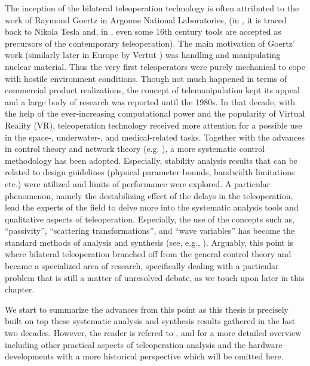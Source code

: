 The inception of the bilateral teleoperation technology is often attributed to the work 
of Raymond Goertz in Argonne National Laboratories, \cite{goertz} (in \cite{basanezsuarez}, 
it is traced back to Nikola Tesla and, in \cite{sheridan89}, even some 16th century tools are accepted as precursors 
of the contemporary  teleoperation). The main motivation of Goertz' work (similarly later in Europe 
by Vertut \cite{vertutcoiffet}) was handling and manipulating nuclear material. Thus the very 
first teleoperators were purely mechanical to cope with hostile environment conditions. Though not much 
happened in terms of commercial product realizations, the concept of telemanipulation kept its appeal 
and a large body of research was reported until the 1980s. In that decade, with the help of the 
ever-increasing computational power and the popularity of Virtual Reality (VR), teleoperation 
technology received more attention for a possible use in the space-, underwater-, and medical-related 
tasks. Together with the advances in control theory and network theory (e.g. \cite{miyazaki,furuta}), 
a more systematic control methodology has been adopted. Especially, stability analysis results that can be 
related to design guidelines (physical parameter bounds, bandwidth limitations etc.) were utilized
and limits of performance were explored. A particular phenomenon, namely the destabilizing effect 
of the delays in the teleoperation, lead the experts of the field to delve more into the systematic 
analysis tools and qualitative aspects of teleoperation. Especially, the use of the concepts such as, 
\enquote{passivity}, \enquote{scattering transformations}, and \enquote{wave variables} has become the 
standard methods of analysis and synthesis (see, e.g., \cite{hannaford89,andersonspong,nieslotine}). 
Arguably, this point is where bilateral teleoperation branched off from the general control theory
and became a specialized area of research, specifically dealing with a particular problem that is still
a matter of unresolved debate, as we touch upon later in this chapter.

We start to summarize the advances from this point as this thesis is precisely built on top these systematic 
analysis and synthesis results gathered in the last two decades. However, the reader is refered to 
\cite{hokayemspong,burdea}, and \cite{sheridan89} for a more detailed overview including other practical 
aspects of teleoperation analysis and the hardware developments with a more historical perspective which 
will be omitted here. 


